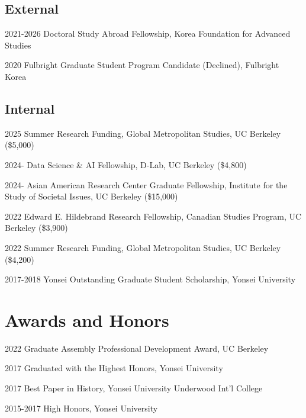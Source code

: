 \documentclass[12pt,letterpaper]{report}
\begin{document}
    \subsection*{External}
    \begin{tablist}
        \item[2021-2026] \tab{}Doctoral Study Abroad Fellowship, Korea Foundation for Advanced Studies
        \item[2020] \tab{}Fulbright Graduate Student Program Candidate (Declined), Fulbright Korea
    \end{tablist}
    \subsection*{Internal}
    \begin{tablist}
        \item[2025] \tab{}Summer Research Funding, Global Metropolitan Studies, UC Berkeley (\$5,000)
        \item[2024-] \tab{}Data Science \& AI Fellowship, D-Lab, UC Berkeley (\$4,800)
        \item[2024-] \tab{}Asian American Research Center Graduate Fellowship, Institute for the Study of Societal Issues, UC Berkeley (\$15,000)
        \item[2022] \tab{}Edward E. Hildebrand Research Fellowship, Canadian Studies Program, UC Berkeley (\$3,900)
        \item[2022] \tab{}Summer Research Funding, Global Metropolitan Studies, UC Berkeley (\$4,200)
        \item[2017-2018] \tab{}Yonsei Outstanding Graduate Student Scholarship, Yonsei University
    \end{tablist}
    
\section*{Awards and Honors}
    \begin{tablist}
        \item[2022] \tab{}Graduate Assembly Professional Development Award, UC Berkeley
        \item[2017] \tab{}Graduated with the Highest Honors, Yonsei University
        \item[2017] \tab{}Best Paper in History, Yonsei University Underwood Int'l College
        \item[2015-2017] \tab{}High Honors, Yonsei University
    \end{tablist}
\end{document}
